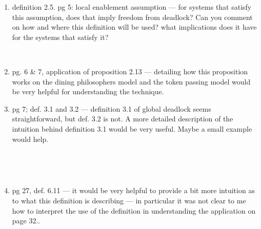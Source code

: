 \begin{enumerate}
~


\item  definition 2.5. pg 5:  local enablement assumption --- for systems 
  that satisfy
this assumption, does that imply freedom from deadlock?   
Can you comment on how and where
this definition will be used?  what implications does it have for 
the systems that satisfy it?

~


\item  pg. 6 \& 7, application of proposition 2.13 --- detailing how this proposition works
on the dining philosophers model and the token passing model would be very helpful
for understanding the technique.


\item pg 7; def. 3.1 and 3.2 --- definition 3.1 of global deadlock seems straightforward, but
def. 3.2 is not.  A more detailed description of the intuition behind definition 3.1 would
be very useful.  Maybe a small example would help.

~


~

\item pg 27, def. 6.11 --- it would be very helpful to provide a bit more
intuition as to what this definition is describing --- in particular it was not
clear to me how to interpret the use of the definition in understanding the
application on page 32..


\end{enumerate}
